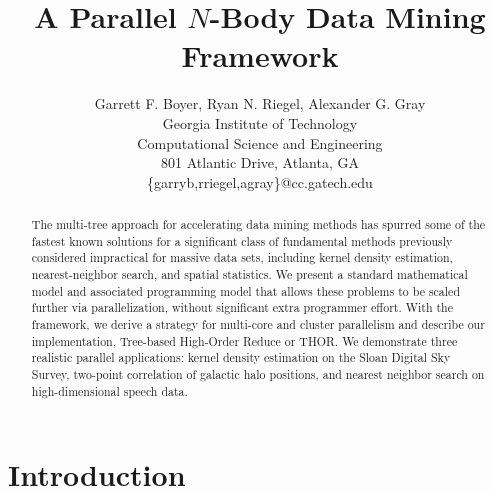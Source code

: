 \documentclass[twoside,leqno,twocolumn]{article}
\begin{document}
\title{A Parallel $N$-Body Data Mining Framework}

\author{Garrett F. Boyer, Ryan N. Riegel, Alexander G. Gray
\\ Georgia Institute of Technology
\\ Computational Science and Engineering
\\ 801 Atlantic Drive, Atlanta, GA
\\ \{garryb,rriegel,agray\}@cc.gatech.edu
\\
}

\maketitle
\thispagestyle{empty}

\begin{abstract}
The multi-tree approach for accelerating data mining methods has spurred some of the fastest known solutions for a significant class of fundamental methods previously considered impractical for massive data sets, including kernel density estimation, nearest-neighbor search, and spatial statistics.
We present a standard mathematical model and associated programming model that allows these problems to be scaled further via parallelization, without significant extra programmer effort.
With the framework, we derive a strategy for multi-core and cluster parallelism and describe our implementation, Tree-based High-Order Reduce or THOR.
We demonstrate three realistic parallel applications: kernel density estimation on the Sloan Digital Sky Survey, two-point correlation of galactic halo positions, and nearest neighbor search on high-dimensional speech data.
\end{abstract}

\section{Introduction}
\end{document}

